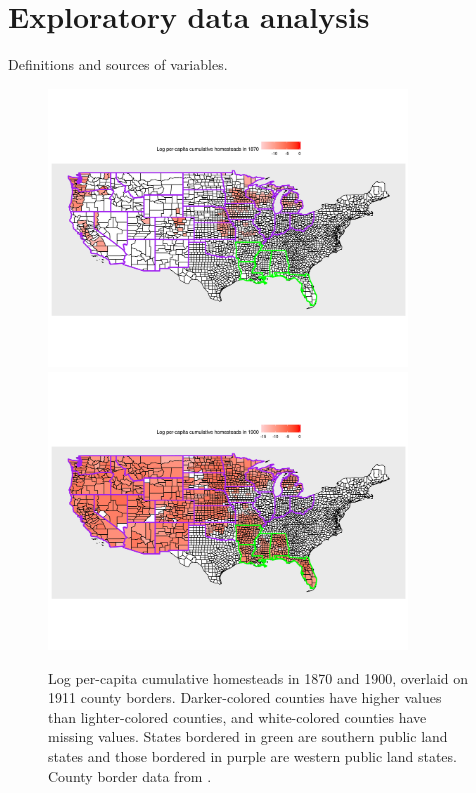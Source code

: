 \documentclass[12pt]{article}
\begin{document}
\pagebreak
\section{Exploratory data analysis} \label{eda}

\begin{table}[htbp]
	\caption{Definitions and sources of variables.}
	\label{dv-table}
	\let\center\empty
	\let\endcenter\relax
	\centering
	\resizebox{.45\width}{!}{}
\end{table}

\begin{figure}[htbp]
		\includegraphics[width=0.85\textwidth]{plots/homestead-1870.png} 
		\includegraphics[width=0.85\textwidth]{plots/homestead-1900.png} 
	\caption{Log per-capita cumulative homesteads in 1870 and 1900, overlaid on 1911 county borders. Darker-colored counties have higher values than lighter-colored counties, and white-colored counties have missing values. States bordered in green are southern public land states and those bordered in purple are western public land states. County border data from \citet{long1995atlas}. \label{homestead-map}} 
\end{figure}
\end{document}

